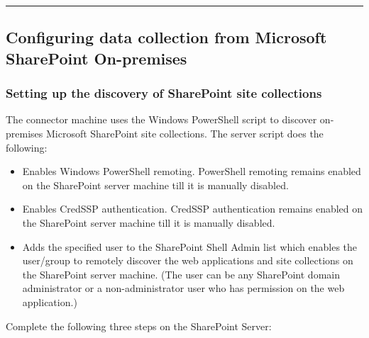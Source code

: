 \documentclass[letterpaper,10pt,english]{sphinxmanual}
\begin{document}
\bigskip\hrule\bigskip



\subsection{Configuring data collection from Microsoft SharePoint On-premises}
\label{\detokenize{mcdmp_app_ug:configuring-data-collection-from-microsoft-sharepoint-on-premises}}

\subsubsection{Setting up the discovery of SharePoint site collections}
\label{\detokenize{mcdmp_app_ug:setting-up-the-discovery-of-sharepoint-site-collections}}\label{\detokenize{mcdmp_app_ug:prereq-sharepoint-onpremises}}
The connector machine uses the Windows PowerShell script to discover on-premises Microsoft SharePoint site collections.
The server script does the following:
\begin{itemize}
\item {} 
Enables Windows PowerShell remoting. PowerShell remoting remains enabled on the SharePoint server machine till it is manually disabled.

\item {} 
Enables CredSSP authentication. CredSSP authentication remains enabled on the SharePoint server machine till it is manually disabled.

\item {} 
Adds the specified user to the SharePoint Shell Admin list which enables the user/group to remotely discover the web applications and site collections on the SharePoint server machine. (The user can be any SharePoint domain administrator or a non-administrator user who has permission on the web application.)

\end{itemize}

Complete the following three steps on the SharePoint Server:
\end{document}
